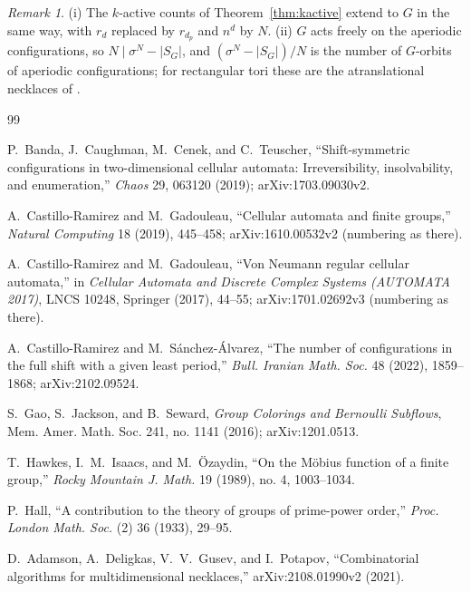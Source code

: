 \documentclass[11pt,a4paper]{article}
\theoremstyle{remark}
\newtheorem{remark}[theorem]{Remark}
\begin{document}
\begin{remark}\label{rem:abelian}
(i) The $k$-active counts of Theorem~\ref{thm:kactive} extend to $G$ in the
same way, with $r_d$ replaced by $r_{d_p}$ and $n^d$ by $N$.
(ii) $G$ acts freely on the aperiodic configurations, so
$N\mid\sigma^N-|S_G|$, and $(\sigma^N-|S_G|)/N$ is the number of
$G$-orbits of aperiodic configurations; for rectangular tori these are the
atranslational necklaces of \cite{adamson2021}.
\end{remark}

\begin{thebibliography}{99}

P.~Banda, J.~Caughman, M.~Cenek, and C.~Teuscher,
``Shift-symmetric configurations in two-dimensional cellular automata:
Irreversibility, insolvability, and enumeration,''
\emph{Chaos} 29, 063120 (2019); arXiv:1703.09030v2.

A.~Castillo-Ramirez and M.~Gadouleau,
``Cellular automata and finite groups,''
\emph{Natural Computing} 18 (2019), 445--458; arXiv:1610.00532v2 (numbering as there).

A.~Castillo-Ramirez and M.~Gadouleau,
``Von Neumann regular cellular automata,''
in \emph{Cellular Automata and Discrete Complex Systems (AUTOMATA 2017)},
LNCS 10248, Springer (2017), 44--55;
arXiv:1701.02692v3 (numbering as there).

A.~Castillo-Ramirez and M.~S\'anchez-\'Alvarez,
``The number of configurations in the full shift with a given least
period,'' \emph{Bull. Iranian Math. Soc.} 48 (2022), 1859--1868;
arXiv:2102.09524.

S.~Gao, S.~Jackson, and B.~Seward,
\emph{Group Colorings and Bernoulli Subflows},
Mem. Amer. Math. Soc. 241, no. 1141 (2016); arXiv:1201.0513.

T.~Hawkes, I.~M.~Isaacs, and M.~\"Ozaydin,
``On the M\"obius function of a finite group,''
\emph{Rocky Mountain J. Math.} 19 (1989), no. 4, 1003--1034.

P.~Hall,
``A contribution to the theory of groups of prime-power order,''
\emph{Proc. London Math. Soc.} (2) 36 (1933), 29--95.

D.~Adamson, A.~Deligkas, V.~V.~Gusev, and I.~Potapov,
``Combinatorial algorithms for multidimensional necklaces,''
arXiv:2108.01990v2 (2021).


\end{thebibliography}
\end{document}
